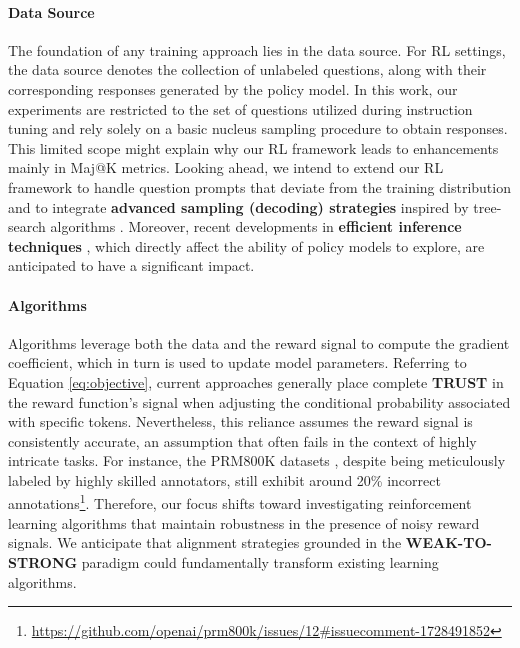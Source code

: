 \begin{itemize}[topsep=0pt]
\paragraph{Data Source} The foundation of any training approach lies in the data source. For RL settings, the data source denotes the collection of unlabeled questions, along with their corresponding responses generated by the policy model. In this work, our experiments are restricted to the set of questions utilized during instruction tuning and rely solely on a basic nucleus sampling procedure to obtain responses. This limited scope might explain why our RL framework leads to enhancements mainly in Maj@K metrics. Looking ahead, we intend to extend our RL framework to handle question prompts that deviate from the training distribution and to integrate \textbf{advanced sampling (decoding) strategies} inspired by tree-search algorithms \citep{yao2023tree}. Moreover, recent developments in \textbf{efficient inference techniques} \citep{xia-etal-2023-speculative,leviathan2023fast,kwon2023efficient,xia2024unlocking}, which directly affect the ability of policy models to explore, are anticipated to have a significant impact.

\paragraph{Algorithms} Algorithms leverage both the data and the reward signal to compute the gradient coefficient, which in turn is used to update model parameters. Referring to Equation \ref{eq:objective}, current approaches generally place complete \textbf{TRUST} in the reward function's signal when adjusting the conditional probability associated with specific tokens. Nevertheless, this reliance assumes the reward signal is consistently accurate, an assumption that often fails in the context of highly intricate tasks. For instance, the PRM800K datasets \citep{lightman2023let}, despite being meticulously labeled by highly skilled annotators, still exhibit around 20\% incorrect annotations\footnote{\url{https://github.com/openai/prm800k/issues/12\#issuecomment-1728491852}}. Therefore, our focus shifts toward investigating reinforcement learning algorithms that maintain robustness in the presence of noisy reward signals. We anticipate that alignment strategies grounded in the \textbf{WEAK-TO-STRONG} \citep{burns2023weak} paradigm could fundamentally transform existing learning algorithms.


\end{itemize}
